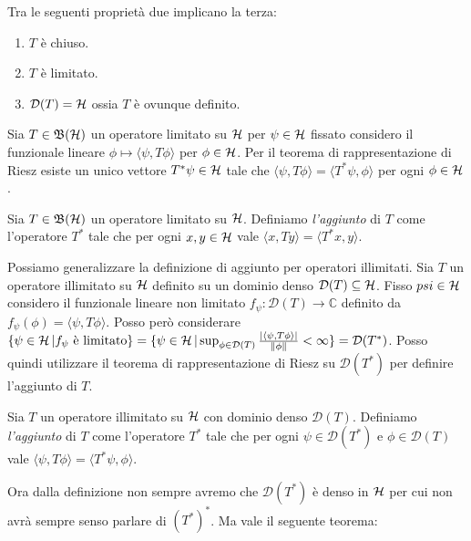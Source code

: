 \begin{theorem}
    Tra le seguenti proprietà due implicano la terza:
\begin{enumerate}
    \item $T$ è chiuso.
    \item $T$ è limitato.
    \item $\mathcal{D}(T)=\operatorname{\mathcal{H}}$ ossia $T$ è ovunque definito.
\end{enumerate}
\end{theorem}

Sia $T \in \operatorname{\mathfrak{B}(\mathcal{H})}$ un operatore limitato su $\operatorname{\mathcal{H}}$ per $\psi \in \operatorname{\mathcal{H}}$ fissato considero il funzionale lineare $\phi \mapsto \langle \psi, T \phi \rangle$ per $\phi \in \operatorname{\mathcal{H}}$. Per il teorema di rappresentazione di Riesz esiste un unico vettore $T^* \psi \in \operatorname{\mathcal{H}}$ tale che $\langle \psi, T \phi \rangle = \langle T^* \psi, \phi \rangle$ per ogni $\phi \in \operatorname{\mathcal{H}}$.

\begin{definition}
    Sia $T \in \operatorname{\mathfrak{B}(\mathcal{H})}$ un operatore limitato su $\operatorname{\mathcal{H}}$. Definiamo \emph{l'aggiunto} di $T$ come l'operatore $T^*$ tale che per ogni $x, y \in \operatorname{\mathcal{H}}$ vale $\langle  x, Ty \rangle = \langle T^* x,  y \rangle$.
\end{definition}

Possiamo generalizzare la definizione di aggiunto per operatori illimitati. Sia $T$ un operatore illimitato su $\operatorname{\mathcal{H}}$ definito su un dominio denso $\mathcal{D}(T) \subseteq \operatorname{\mathcal{H}}$. Fisso $psi \in \operatorname{\mathcal{H}}$ considero il funzionale lineare non limitato $f_\psi : \mathcal{D}(T) \to \mathbb{C}$ definito da $f_\psi(\phi) = \langle \psi, T \phi \rangle$. Posso però considerare $\{ \psi \in \operatorname{\mathcal{H}} | f_\psi \text{ è limitato} \} = \{ \psi \in \operatorname{\mathcal{H}} | \sup_{\phi \in \mathcal{D}(T)} \frac{|\langle \psi, T \phi \rangle|}{\| \phi \|} < \infty \} = \mathcal{D}(T^*)$. 
Posso quindi utilizzare il teorema di rappresentazione di Riesz su $\mathcal{D}(T^*)$ per definire l'aggiunto di $T$.

\begin{definition}
    Sia $T$ un operatore illimitato su $\operatorname{\mathcal{H}}$ con dominio denso $\mathcal{D}(T)$. Definiamo \emph{l'aggiunto} di $T$ come l'operatore $T^*$ tale che per ogni $\psi \in \mathcal{D}(T^*)$ e $\phi \in \mathcal{D}(T)$ vale $\langle  \psi, T\phi \rangle = \langle T^* \psi,  \phi \rangle$.
\end{definition}

Ora dalla definizione non sempre avremo che $\mathcal{D}(T^*)$ è denso in $\operatorname{\mathcal{H}}$ per cui non avrà sempre senso parlare di $(T^*)^*$. Ma vale il seguente teorema:


